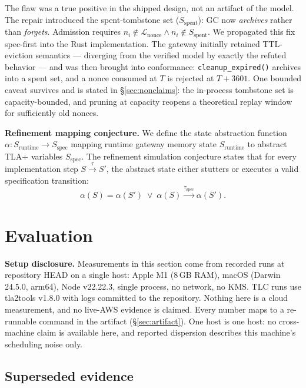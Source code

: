 \documentclass[10pt,twocolumn,letterpaper]{article}
\begin{document}
The flaw was a true positive in the shipped design, not an artifact of the model. The repair introduced the spent-tombstone set ($S_{\mathrm{spent}}$): GC now \emph{archives} rather than \emph{forgets}. Admission requires $n_i \notin \mathcal{L}_{\mathrm{nonce}} \wedge n_i \notin S_{\mathrm{spent}}$. We propagated this fix spec-first into the Rust implementation. The gateway initially retained TTL-eviction semantics --- diverging from the verified model by exactly the refuted behavior --- and was then brought into conformance: \texttt{cleanup\_expired()} archives into a spent set, and a nonce consumed at $T$ is rejected at $T+3601$. One bounded caveat survives and is stated in \S\ref{sec:nonclaims}: the in-process tombstone set is capacity-bounded, and pruning at capacity reopens a theoretical replay window for sufficiently old nonces.

\textbf{Refinement mapping conjecture.} We define the state abstraction function $\alpha: S_{\mathrm{runtime}} \to S_{\mathrm{spec}}$ mapping runtime gateway memory state $S_{\mathrm{runtime}}$ to abstract TLA+ variables $S_{\mathrm{spec}}$. The refinement simulation conjecture states that for every implementation step $S \xrightarrow{\tau} S'$, the abstract state either stutters or executes a valid specification transition:
\begin{equation}
\alpha(S) = \alpha(S') \;\lor\; \alpha(S) \xrightarrow{\tau_{\mathrm{spec}}} \alpha(S').
\label{eq:refinement-sim}
\end{equation}

\section{Evaluation}
\label{sec:eval}

\noindent\textbf{Setup disclosure.} Measurements in this section come from
recorded runs at repository HEAD on a single host: Apple M1 (8\,GB RAM),
macOS (Darwin 24.5.0, arm64), Node v22.22.3, single process, no network, no
KMS. TLC runs use tla2tools v1.8.0 with logs committed to the
repository. Nothing here is a cloud measurement, and no live-AWS evidence is
claimed. Every number maps to a re-runnable command in the artifact
(\S\ref{sec:artifact}). One host is one host: no cross-machine claim is
available here, and reported dispersion describes this machine's scheduling
noise only.

\subsection{Superseded evidence}
\label{sec:superseded}
\end{document}
